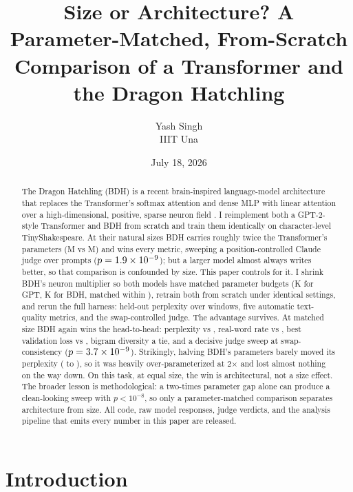 \documentclass[11pt]{article}
\title{Size or Architecture? A Parameter-Matched, From-Scratch\\Comparison of a Transformer and the Dragon Hatchling}
\author{Yash Singh\\\small IIIT Una}
\date{July 18, 2026}
\begin{document}
\maketitle

\begin{abstract}
The Dragon Hatchling (BDH) is a recent brain-inspired language-model
architecture that replaces the Transformer's softmax attention and dense MLP
with linear attention over a high-dimensional, positive, sparse neuron field
\cite{kosowski2025bdh}. I reimplement both a GPT-2-style Transformer and BDH
from scratch and train them identically on character-level TinyShakespeare. At
their natural sizes BDH carries roughly twice the Transformer's parameters
(\BdhBigParamsM{}M vs \GptParamsM{}M) and wins every metric, sweeping a
position-controlled Claude judge \JudgeBigScore{} over \NPrompts{} prompts
($p=1.9\times10^{-9}$); but a larger model almost always writes better, so that
comparison is confounded by size. This paper controls for it. I shrink BDH's
neuron multiplier so both models have
matched parameter budgets (\GptParamsK{}K for GPT, \BdhParamsK{}K for BDH,
matched within \MatchPct{}), retrain both from scratch under identical settings, and
rerun the full harness: held-out perplexity over \NWindows{} windows, five
automatic text-quality metrics, and the swap-controlled judge. The advantage survives. At matched size BDH again
wins the head-to-head: perplexity \BdhPpl{} vs \GptPpl{}, real-word rate
\BdhRealWord{} vs \GptRealWord{}, best validation loss \BdhValLoss{} vs
\GptValLoss{}, bigram diversity a tie, and a
\MatchScore{} decisive judge sweep at \Consistency{} swap-consistency
($p=3.7\times10^{-9}$). Strikingly, halving BDH's parameters barely moved its perplexity
(\BdhPplBig{} to \BdhPpl{}), so it was heavily over-parameterized at 2$\times$ and
lost almost nothing on the way down. On this task, at equal size, the win is
architectural, not a size effect.
The broader lesson is methodological: a two-times parameter gap alone can produce
a clean-looking \JudgeBigScore{} sweep with $p<10^{-8}$, so only a
parameter-matched comparison separates architecture from size. All code, raw model
responses, judge verdicts, and the analysis pipeline that emits every number in
this paper are released.
\end{abstract}

\section{Introduction}
\end{document}
